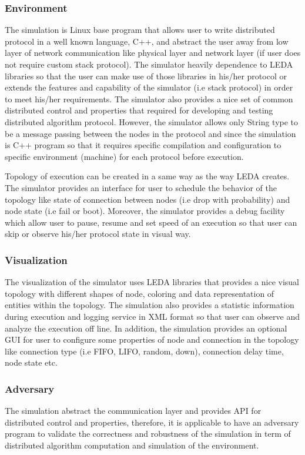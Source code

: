 \subsubsection{Environment}
The simulation is Linux base program that allows user to write distributed protocol in a well known language, C++, and abstract the user away from low layer of network communication like physical layer and network layer (if user does not require custom stack protocol). The simulator heavily dependence to LEDA libraries so that the user can make use of those libraries in his/her protocol or extends the features and capability of the simulator (i.e stack protocol) in order to meet his/her requirements. The simulator also provides a nice set of common distributed control and properties that required for developing and testing distributed algorithm protocol. However, the simulator allows only String type to be a message passing between the nodes in the protocol and since the simulation is C++ program so that it requires specific compilation and configuration to specific environment (machine) for each protocol before execution.

Topology of execution can be created in a same way as the way LEDA creates. The simulator provides an interface for user to schedule the behavior of the topology like state of connection between nodes (i.e drop with probability) and node state (i.e fail or boot). Moreover, the simulator provides a debug facility which allow user to pause, resume and set speed of an execution so that user can skip or observe his/her protocol state in visual way.

\subsubsection{Visualization}
The visualization of the simulator uses LEDA libraries that provides a nice visual topology with different shapes of node, coloring and data representation of entities within the topology. The simulation also provides a statistic information during execution and logging service in XML format so that user can observe and analyze the execution off line. In addition, the simulation provides an optional GUI for user to configure some properties of node and connection in the topology like connection type (i.e FIFO, LIFO, random, down), connection delay time, node state etc.

\subsubsection{Adversary}
The simulation abstract the communication layer and provides API for distributed control and properties, therefore, it is applicable to have an adversary program to validate the correctness and robustness of the simulation in term of distributed algorithm computation and simulation of the environment.


